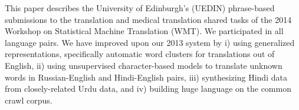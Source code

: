 This paper describes the University of Edinburgh's (UEDIN) phrase-based submissions to the translation and medical translation shared tasks of the 2014 Workshop on Statistical Machine Translation (WMT). We participated in all language pairs.  We have improved upon our 2013 system by i) using generalized representations, specifically automatic word clusters for translations out of English, ii) using unsupervised character-based models to translate unknown words in Russian-English and Hindi-English pairs, iii) synthesizing Hindi data from closely-related Urdu data, and iv) building huge language on the common crawl corpus.
